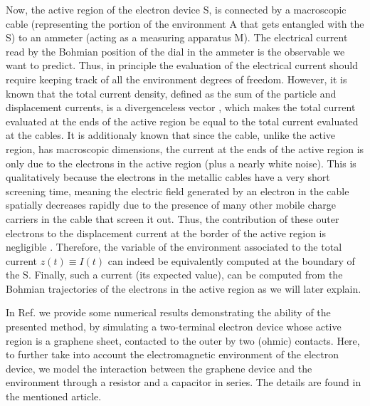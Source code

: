 \documentclass[11pt, a4paper]{article} %
\begin{document}
Now, the active region of the electron device S, is connected by a macroscopic cable (representing the portion of the environment A that gets entangled with the S) to an ammeter (acting as a measuring apparatus M). The electrical current read by the Bohmian position of the dial in the ammeter is the observable we want to predict. Thus, in principle the evaluation of the electrical current should require keeping track of all the environment degrees of freedom. However, it is known that the total current density, defined as the sum of the particle and displacement currents, is a divergenceless vector \cite{diver1, diver2}, which makes the total current evaluated at the ends of the active region be equal to the total current evaluated at the cables. It is additionaly known \cite{equiv} that since the cable, unlike the active region, has macroscopic dimensions, the current at the ends of the active region is only due to the electrons in the active region (plus a nearly white noise). This is qualitatively because the electrons in the metallic cables have a very short screening time, meaning the electric field generated by an electron in the cable spatially decreases rapidly due to the presence of many other mobile charge carriers in the cable that screen it out. Thus, the contribution of these outer electrons to the displacement current at the border of the active region is negligible \cite{neg}. Therefore, the variable of the environment associated to the total current $z(t)\equiv I(t)$ can indeed be equivalently computed at the boundary of the S. Finally, such a current (its expected value), can be computed from the Bohmian trajectories of the electrons in the active region as we will later explain. 

In Ref. \cite{Thz} we provide some numerical results demonstrating the ability of the presented method, by simulating a two-terminal electron device whose active region is a graphene sheet, contacted to the outer by two (ohmic) contacts. Here, to further take into account the electromagnetic environment of the electron device, we model the interaction between the graphene device and the environment through a resistor and a capacitor in series. The details are found in the mentioned article. 
\end{document}
